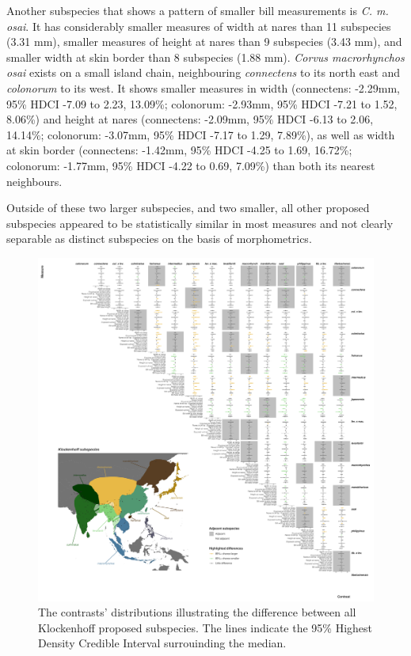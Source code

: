 \documentclass[10pt,a4paper]{article}
\begin{document}
Another subspecies that shows a pattern of smaller bill measurements is \emph{C. m. osai}.
It has considerably smaller measures of width at nares than 11 subspecies (3.31 mm), smaller measures of height at nares than 9 subspecies (3.43 mm), and smaller width at skin border than 8 subspecies (1.88 mm).
\emph{Corvus macrorhynchos osai} exists on a small island chain, neighbouring \emph{connectens} to its north east and \emph{colonorum} to its west.
It shows smaller measures in width (connectens: -2.29mm, 95\% HDCI -7.09 to 2.23, 13.09\%; colonorum: -2.93mm, 95\% HDCI -7.21 to 1.52, 8.06\%) and height at nares (connectens: -2.09mm, 95\% HDCI -6.13 to 2.06, 14.14\%; colonorum: -3.07mm, 95\% HDCI -7.17 to 1.29, 7.89\%), as well as width at skin border (connectens: -1.42mm, 95\% HDCI -4.25 to 1.69, 16.72\%; colonorum: -1.77mm, 95\% HDCI -4.22 to 0.69, 7.09\%) than both its nearest neighbours.

Outside of these two larger subspecies, and two smaller, all other proposed subspecies appeared to be statistically similar in most measures and not clearly separable as distinct subspecies on the basis of morphometrics.

\begin{figure}
\includegraphics[width=0.9\linewidth]{../Figures/klockSpecies_HDCI_contrasts} \caption{The contrasts' distributions illustrating the difference between all Klockenhoff proposed subspecies. The lines indicate the 95\% Highest Density Credible Interval surrouinding the median.}\label{fig:klockContrasts}
\end{figure}
\end{document}
